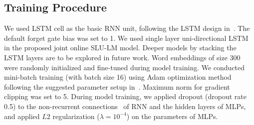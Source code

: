 \documentclass[11pt]{article}
\begin{document}
\subsection{Training Procedure}    
    We used LSTM cell as the basic RNN unit, following the LSTM design in~\cite{zaremba:14}. The default forget gate bias was set to 1. We used single layer uni-directional LSTM in the proposed joint online SLU-LM model. Deeper models by stacking the LSTM layers are to be explored in future work. Word embeddings of size 300 were randomly initialized and fine-tuned during model training. We conducted mini-batch training (with batch size 16) using Adam optimization method following the suggested parameter setup in~\cite{kingma:14}. Maximum norm for gradient clipping was set to 5. During model training, we applied dropout (dropout rate 0.5) to the non-recurrent connections~\cite{zaremba:14} of RNN and the hidden layers of MLPs, and applied $L2$ regularization ($\lambda = 10^{-4}$) on the parameters of MLPs. 
    
\end{document}
